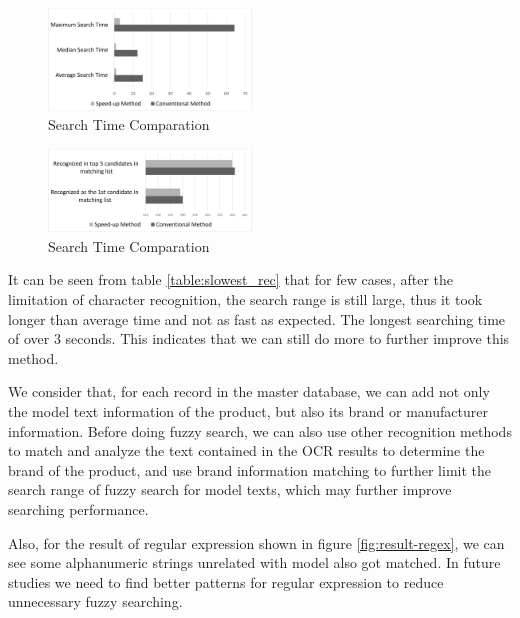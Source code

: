 \documentclass[technicalreport]{ieicej}
\begin{document}
            \begin{figure}[t] 
                \begin{center}
                \includegraphics[width=0.48\textwidth]{figure/graph-time.pdf}
                \end{center}
                \caption{Search Time Comparation}
                \label{fig:graph-time}
            \end{figure}

            \begin{figure}[t] 
                \begin{center}
                \includegraphics[width=0.48\textwidth]{figure/graph-recognized.pdf}
                \end{center}
                \caption{Search Time Comparation}
                \label{fig:graph-recognized}
            \end{figure}
            
            It can be seen from table \ref{table:slowest_rec} that for few cases, after the limitation of character recognition, the search range is still large, thus it took longer than average time and not as fast as expected. The longest searching time of over 3 seconds. This indicates that we can still do more to further improve this method.
            
            We consider that, for each record in the master database, we can add not only the model text information of the product, but also its brand or manufacturer information. Before doing fuzzy search, we can also use other recognition methods to match and analyze the text contained in the OCR results to determine the brand of the product, and use brand information matching to further limit the search range of fuzzy search for model texts, which may further improve searching performance.

            Also, for the result of regular expression shown in figure \ref{fig:result-regex}, we can see some alphanumeric strings unrelated with model also got matched. In future studies we need to find better patterns for regular expression to reduce unnecessary fuzzy searching.
\end{document}
